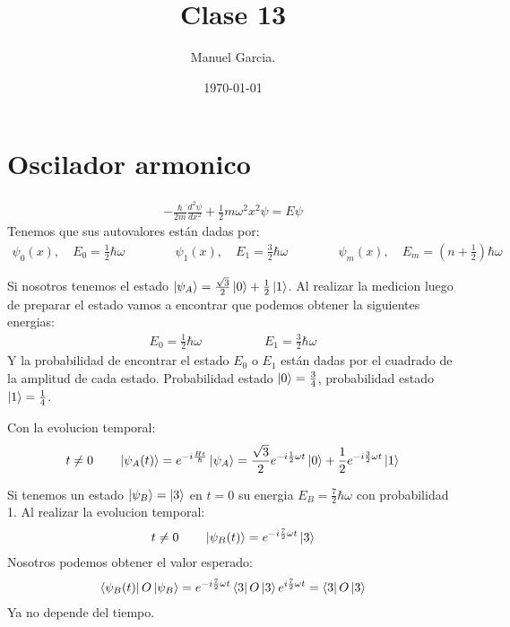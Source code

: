 \documentclass{article}
\title{Clase 13}
\author{Manuel Garcia.}
\date{\today}
\begin{document}
\maketitle

\section{Oscilador armonico}
\begin{gather*}
  - \frac{\hbar }{2m }\frac{d ^2 \psi  }{d x ^2} + \frac{1}{2}m \omega ^2 x ^2 \psi  = E \psi
\end{gather*}
Tenemos que sus autovalores están dadas por:  
\begin{gather*}
  \psi_0(x),\quad E_0 = \frac{1}{2}\hbar  \omega \qquad \qquad \psi_1(x), \quad E_1 = \frac{3}{2} \hbar \omega\qquad \qquad \psi_m (x), \quad E_m = \left(n + \frac{1}{2}\right) \hbar \omega
\end{gather*}

Si nosotros tenemos el estado $ \ket{\psi_A } = \frac{\sqrt{3 } }{2} \ket{0 } + \frac{1}{2} \ket{1 } $. Al realizar la medicion luego de preparar el estado vamos a encontrar que podemos obtener la siguientes energias: 
\begin{gather*}
   E_0 = \frac{1}{2}\hbar  \omega \qquad \qquad \quad E_1 = \frac{3}{2} \hbar \omega
\end{gather*}
Y la probabilidad de encontrar el estado $ E_0  $ o $ E_1  $ están dadas por el cuadrado de la amplitud de cada estado. Probabilidad estado $ \ket{0 } = \frac{3}{4} $, probabilidad estado $ \ket{1 } = \frac{1}{4}$.

Con la evolucion temporal: 
\begin{gather*}
  t\neq 0 \qquad \ket{\psi_A (t) } = e ^ {- i \frac{H t }{\hbar }}\ket{\psi_A } = \frac{\sqrt{3 } }{2} e ^ {- i \frac{1}{2}\omega t }\ket{0 } + \frac{1}{2} e ^ {-i \frac{3}{2} \omega t }\ket{1 } 
\end{gather*}

Si tenemos un estado $ \ket{\psi_B } = \ket{3 } $ en $ t = 0  $ su energia $ E_B = \frac{7 }{2} \hbar \omega $ con probabilidad 1. Al realizar la evolucion temporal: 
\begin{gather*}
  t\neq 0 \qquad \ket{\psi_B(t)} = e ^ {- i \frac{7 }{2} \omega t } \ket{3 } 
\end{gather*}
Nosotros podemos obtener el valor esperado: 
\begin{gather*}
  \bra{\psi_B (t) }O \ket{\psi_B } = e ^ {- i \frac{7 }{2} \omega t }\bra{3 }O \ket{3 }e ^ { i \frac{7}{2} \omega t } = \bra{3 }O \ket{3 }    
\end{gather*}
Ya no depende del tiempo.
\end{document}
